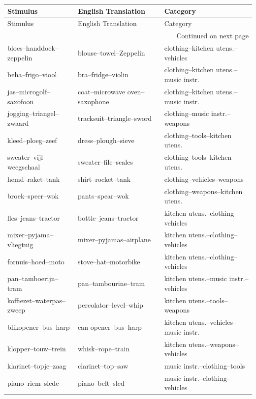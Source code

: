 \documentclass[doc]{apa6}
\begin{document}
\begin{appendix}
\begin{small}
\begin{longtable}{lll}
Stimulus & English Translation & Category \\
\toprule
\endfirsthead

Stimulus & English Translation & Category \\
\toprule
\endhead

\bottomrule
\multicolumn{3}{r}{Continued on next page} \\
\endfoot

\bottomrule
\endlastfoot

bloes--handdoek--zeppelin & blouse--towel--Zeppelin & clothing--kitchen utens.--vehicles \\
beha--frigo--viool & bra--fridge--violin & clothing--kitchen utens.--music instr. \\
jas--microgolf--saxofoon & coat--microwave oven--saxophone & clothing--kitchen utens.--music instr. \\
jogging--triangel--zwaard & tracksuit--triangle--sword & clothing--music instr.--weapons \\
kleed--ploeg--zeef & dress--plough--sieve & clothing--tools--kitchen utens. \\
sweater--vijl--weegschaal & sweater--file--scales & clothing--tools--kitchen utens. \\
hemd--raket--tank & shirt--rocket--tank & clothing--vehicles--weapons \\
broek--speer--wok & pants--spear--wok & clothing--weapons--kitchen utens. \\
fles--jeans--tractor & bottle--jeans--tractor & kitchen utens.--clothing--vehicles \\
mixer--pyjama--vliegtuig & mixer--pyjamas--airplane & kitchen utens.--clothing--vehicles \\
fornuis--hoed--moto & stove--hat--motorbike & kitchen utens.--clothing--vehicles \\
pan--tamboerijn--tram & pan--tambourine--tram & kitchen utens.--music instr.--vehicles \\
koffiezet--waterpas--zweep & percolator--level--whip & kitchen utens.--tools--weapons \\
blikopener--bus--harp & can opener--bus--harp & kitchen utens.--vehicles--music instr. \\
klopper--touw--trein & whisk--rope--train & kitchen utens.--weapons--vehicles \\
klarinet--topje--zaag & clarinet--top--saw & music instr.--clothing--tools \\
piano--riem--slede & piano--belt--sled & music instr.--clothing--vehicles \\

\end{longtable}
\end{small}
\end{appendix}
\end{document}
